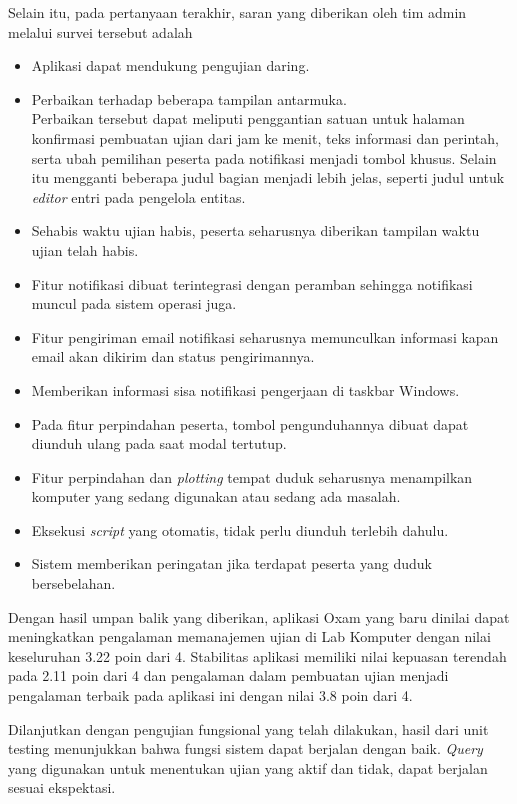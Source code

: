     Selain itu, pada pertanyaan terakhir, saran yang diberikan oleh tim admin melalui survei tersebut adalah
    \begin{itemize}
        \item Aplikasi dapat mendukung pengujian daring.
        \item Perbaikan terhadap beberapa tampilan antarmuka. \\
            Perbaikan tersebut dapat meliputi penggantian satuan untuk halaman konfirmasi pembuatan ujian dari jam
            ke menit, teks informasi dan perintah, serta ubah pemilihan peserta pada notifikasi menjadi tombol khusus.
            Selain itu mengganti beberapa judul bagian menjadi lebih jelas, seperti judul untuk \textit{editor}
            entri pada pengelola entitas.
        \item Sehabis waktu ujian habis, peserta seharusnya diberikan tampilan waktu ujian telah habis.
        \item Fitur notifikasi dibuat terintegrasi dengan peramban sehingga notifikasi muncul pada 
            sistem operasi juga.
        \item Fitur pengiriman email notifikasi seharusnya memunculkan informasi kapan email akan
            dikirim dan status pengirimannya.
        \item Memberikan informasi sisa notifikasi pengerjaan di taskbar Windows.
        \item Pada fitur perpindahan peserta, tombol pengunduhannya dibuat dapat diunduh ulang pada
            saat modal tertutup.
        \item Fitur perpindahan dan \textit{plotting} tempat duduk seharusnya menampilkan komputer
            yang sedang digunakan atau sedang ada masalah.
        \item Eksekusi \textit{script} yang otomatis, tidak perlu diunduh terlebih dahulu.
        \item Sistem memberikan peringatan jika terdapat peserta yang duduk bersebelahan.
    \end{itemize}
    
    Dengan hasil umpan balik yang diberikan, aplikasi Oxam yang baru dinilai dapat meningkatkan
    pengalaman memanajemen ujian di Lab Komputer dengan nilai keseluruhan 3.22 poin dari 4. Stabilitas
    aplikasi memiliki nilai kepuasan terendah pada 2.11 poin dari 4 dan pengalaman
    dalam pembuatan ujian menjadi pengalaman terbaik pada aplikasi ini dengan nilai 3.8 poin dari 4.
    
    Dilanjutkan dengan pengujian fungsional yang telah dilakukan, hasil dari unit testing menunjukkan
    bahwa fungsi sistem dapat berjalan dengan baik. \textit{Query} yang digunakan untuk menentukan
    ujian yang aktif dan tidak, dapat berjalan sesuai ekspektasi.